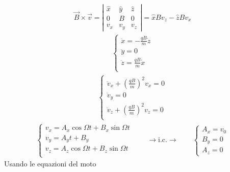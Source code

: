 \documentclass[letterpaper,10pt,italian]{jupyterBook}
\begin{document}
\begin{equation*}
\begin{split}
\vec{B} \times \vec{v} = \left|\begin{matrix} \hat{x} & \hat{y} & \hat{z} \\ 0 & B & 0 \\ v_x & v_y & v_z \end{matrix}\right| =  \hat{x} B v_z - \hat{z} B v_x 
\end{split}
\end{equation*}\begin{equation*}
\begin{split}\begin{cases}
  \ddot{x} = - \frac{q B}{m} \dot{z} \\
  \ddot{y} = 0                       \\
  \ddot{z} =   \frac{q B}{m} \dot{x} \\
\end{cases}\end{split}
\end{equation*}\begin{equation*}
\begin{split}\begin{cases}
  \ddot{v}_x + \left(\frac{q B}{m}\right)^2 v_x = 0 \\
  \ddot{v}_y = 0                                    \\
  \ddot{v}_z + \left(\frac{q B}{m}\right)^2 v_z = 0 \\
\end{cases}\end{split}
\end{equation*}\begin{equation*}
\begin{split}\begin{cases}
v_x = A_x \cos \Omega t + B_x \sin \Omega t \\
v_y = A_y t + B_y                           \\
v_z = A_z \cos \Omega t + B_z \sin \Omega t \\
\end{cases}
\qquad \rightarrow \text{i.c.} \rightarrow \qquad
\begin{cases}
 A_x = v_0 \\
 B_y = 0 \\
 A_z = 0
\end{cases}
\end{split}
\end{equation*}
\sphinxAtStartPar
Usando le equazioni del moto
\end{document}
